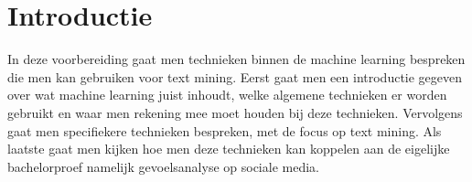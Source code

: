 \chapter{Introductie}\label{introductie}
In deze voorbereiding gaat men technieken binnen de machine learning bespreken die men kan gebruiken voor text mining. Eerst gaat men een introductie gegeven over wat machine learning juist inhoudt, welke algemene technieken er worden gebruikt en waar men rekening mee moet houden bij deze technieken. Vervolgens gaat men specifiekere technieken bespreken, met de focus op text mining. Als laatste gaat men kijken hoe men deze technieken kan koppelen aan de eigelijke bachelorproef namelijk gevoelsanalyse op sociale media.
